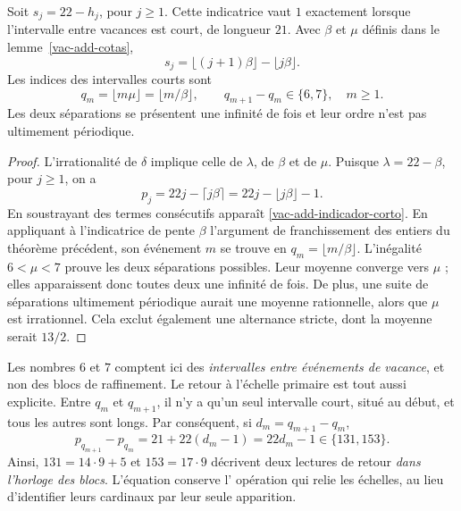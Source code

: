 \begin{theorem}
\label{vac-add-teorema-secundario}
Soit \(s_j=22-h_j\), pour \(j\geq1\). Cette indicatrice vaut \(1\) exactement lorsque l'intervalle entre vacances est court, de longueur \(21\). Avec \(\beta\) et \(\mu\) définis dans le lemme~\ref{vac-add-cotas},
\begin{equation}
 s_j=\lfloor(j+1)\beta\rfloor-\lfloor j\beta\rfloor.
 \label{vac-add-indicador-corto}
\end{equation}
Les indices des intervalles courts sont
\begin{equation}
 q_m=\lfloor m\mu\rfloor=\lfloor m/\beta\rfloor,
 \qquad q_{m+1}-q_m\in\{6,7\},\quad m\geq1.
 \label{vac-add-posiciones-cortos}
\end{equation}
Les deux séparations se présentent une infinité de fois et leur ordre n'est pas
ultimement périodique.
\end{theorem}
\begin{proof}
L'irrationalité de \(\delta\) implique celle de \(\lambda\),
de \(\beta\) et de \(\mu\). Puisque \(\lambda=22-\beta\), pour
\(j\geq1\), on a
\[
 p_j=22j-\lceil j\beta\rceil
     =22j-\lfloor j\beta\rfloor-1.
\]
En soustrayant des termes consécutifs apparaît
\eqref{vac-add-indicador-corto}. En appliquant à l'indicatrice de pente
\(\beta\) l'argument de franchissement des entiers du théorème précédent,
son événement \(m\) se trouve en \(q_m=\lfloor m/\beta\rfloor\).
L'inégalité \(6<\mu<7\) prouve les deux séparations possibles.
Leur moyenne converge vers \(\mu\) ; elles apparaissent donc toutes deux une infinité
de fois. De plus, une suite de séparations ultimement périodique
aurait une moyenne rationnelle, alors que \(\mu\) est irrationnel. Cela exclut
également une alternance stricte, dont la moyenne serait \(13/2\).
\end{proof}

Les nombres \(6\) et \(7\) comptent ici des \emph{intervalles entre événements de vacance}, et non des blocs de raffinement. Le retour à l'échelle primaire est tout aussi explicite. Entre \(q_m\) et \(q_{m+1}\), il n'y a qu'un seul intervalle court, situé au début, et tous les autres sont longs. Par conséquent, si \(d_m=q_{m+1}-q_m\),
\begin{equation}
 p_{q_{m+1}}-p_{q_m}=21+22(d_m-1)=22d_m-1
 \in\{131,153\}.
 \label{vac-add-retorno-bloques}
\end{equation}
Ainsi, \(131=14\cdot9+5\) et \(153=17\cdot9\) décrivent deux lectures
de retour \emph{dans l'horloge des blocs}. L'équation conserve l'
opération qui relie les échelles, au lieu d'identifier leurs
cardinaux par leur seule apparition.

